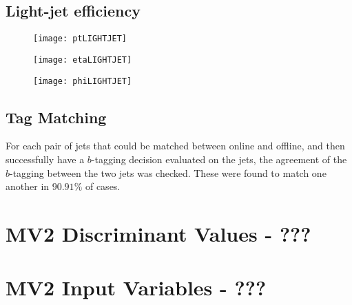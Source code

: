 	\newpage
	\subsection{Light-jet efficiency}
	
		\begin{figure}[h]
			\centering
			\begin{minipage}[h]{0.31\linewidth}
				\texttt{[image: ptLIGHTJET]}
				
			\end{minipage}
			\quad
			\begin{minipage}[h]{0.31\linewidth}
				\texttt{[image: etaLIGHTJET]}
			\end{minipage}
			\quad
			\begin{minipage}[h]{0.31\linewidth}
				\texttt{[image: phiLIGHTJET]}
			\end{minipage}
			\caption{ }
			\label{fig:MC:lightjetefficiency}
		\end{figure}
	
	\subsection{Tag Matching}
	
	For each pair of jets that could be matched between online and offline, and then successfully have a $b$-tagging decision evaluated on the jets, the agreement of the $b$-tagging between the two jets was checked. These were found to match one another in $90.91\%$ of cases.
	
	\section{MV2 Discriminant Values - ???} 
	
	
	\section{MV2 Input Variables - ???}


\endinput
